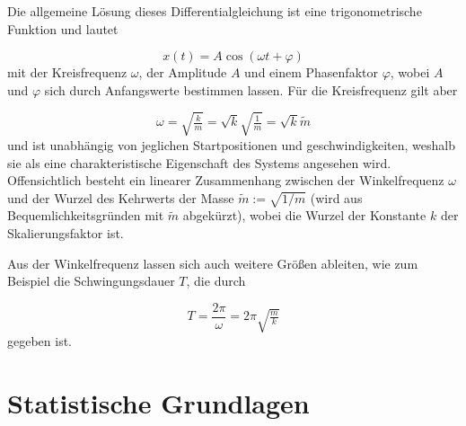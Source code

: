 Die allgemeine Lösung dieses Differentialgleichung ist eine trigonometrische Funktion und lautet 

\begin{equation}\label{eqn:sol}
	x(t) = A\cos(\omega t + \varphi)
\end{equation}
mit der Kreisfrequenz \( \omega \), der Amplitude \( A \) und einem Phasenfaktor \( \varphi \), wobei \( A \) und \( \varphi \) sich durch Anfangswerte bestimmen lassen. Für die Kreisfrequenz gilt aber

\begin{equation}\label{eqn:omega}
	\omega = \sqrt{\tfrac{k}{m}} = \sqrt{k}\sqrt{\tfrac{1}{m}} = \sqrt{k}\tilde{m}
\end{equation}
und ist unabhängig von jeglichen Startpositionen und geschwindigkeiten, weshalb sie als eine charakteristische Eigenschaft des Systems angesehen wird. Offensichtlich besteht ein linearer Zusammenhang zwischen der Winkelfrequenz \( \omega \) und der Wurzel des Kehrwerts der Masse \( \tilde{m} := \sqrt{1/m} \) (wird aus Bequemlichkeitsgründen mit \( \tilde{m} \) abgekürzt), wobei die Wurzel der Konstante \( k \) der Skalierungsfaktor ist. 




Aus der Winkelfrequenz lassen sich auch weitere Größen ableiten, wie zum Beispiel die Schwingungsdauer \( T \), die durch

\begin{equation}\label{eqn:T}
	T = \frac{2\pi}{\omega} = 2\pi \sqrt{\tfrac{m}{k}}
\end{equation}
gegeben ist.

\section{Statistische Grundlagen}


